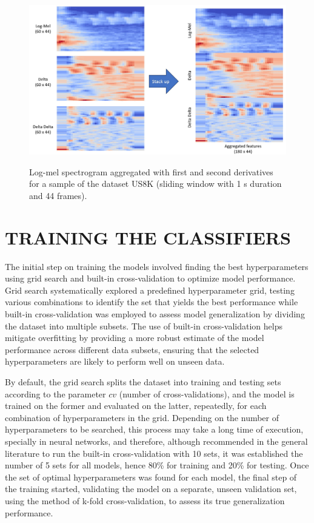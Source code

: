 \begin{figure}[htbp]
    \raggedright
        \caption{Log-mel spectrogram aggregated with first and second derivatives for a sample of the dataset US8K (sliding window with 1 \gls{s} duration and 44 frames).}
        \includegraphics[width=1\textwidth]{resources/images/050-methods/Methods_feature_extraction_3_US8K.jpg}
        \label{fig:methods_feature_extraction_log-mel_spectrogram}
\end{figure}

\section{TRAINING THE CLASSIFIERS}
\label{sec:methods_training_classifiers}

The initial step on training the models involved finding the best hyperparameters using grid search and built-in cross-validation \cite{scikitle61} to optimize model performance. Grid search systematically explored a predefined hyperparameter grid, testing various combinations to identify the set that yields the best performance while built-in cross-validation was employed to assess model generalization by dividing the dataset into multiple subsets. The use of built-in cross-validation helps mitigate overfitting by providing a more robust estimate of the model performance across different data subsets, ensuring that the selected hyperparameters are likely to perform well on unseen data.

By default, the grid search splits the dataset into training and testing sets according to the parameter $cv$ (number of cross-validations), and the model is trained on the former and evaluated on the latter, repeatedly, for each combination of hyperparameters in the grid. Depending on the number of hyperparameters to be searched, this process may take a long time of execution, specially in neural networks, and therefore, although recommended in the general literature to run the built-in cross-validation with 10 sets, it was established the number of 5 sets for all models, hence 80\% for training and 20\% for testing. Once the set of optimal hyperparameters was found for each model, the final step of the training started, validating the model on a separate, unseen validation set, using the method of k-fold cross-validation, to assess its true generalization performance. 

